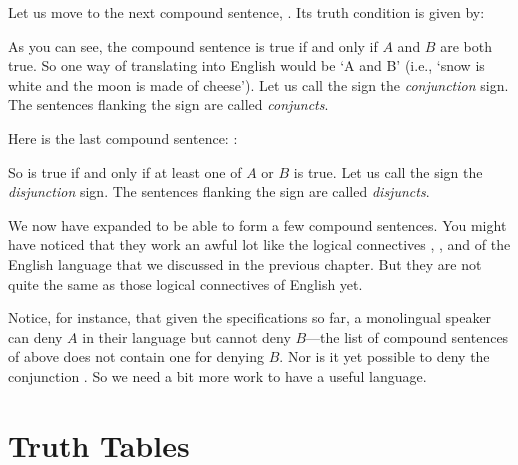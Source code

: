 Let us move to the next compound sentence, . Its truth condition 
is given by:

\begin{center}


\end{center}

As you can see,  the compound sentence  is true if and only if 
$A$ and $B$ are both true. So one way of translating  into 
English would be `A and B' (i.e., `snow is white and the moon is made of  
cheese').  Let us call the \p{\land} sign the \emph{conjunction} sign. The 
sentences flanking the sign are called \emph{conjuncts}.

Here is the last compound sentence: :

\begin{center}


\end{center}

So  is true if and only if at least one of $A$ or $B$ is true.  
Let us call the \p{\lor} sign the \emph{disjunction} sign. The sentences 
flanking the sign are called  \emph{disjuncts}.

We now have expanded \lL[S]{} to be able to form a few compound sentences. You 
might have noticed that they work an awful lot like the logical connectives 
, , and  of the English language that 
we discussed in the previous chapter. But they are not quite the same as those 
logical connectives of English yet.

Notice, for instance, that given the specifications so far, a monolingual 
speaker can deny $A$ in their language but cannot deny $B$---the list of 
compound sentences of \lL[S]{} above does not contain one for denying $B$. Nor is 
it yet possible to deny the conjunction . So we need a bit more 
work to have a useful language.



\section{Truth Tables}

